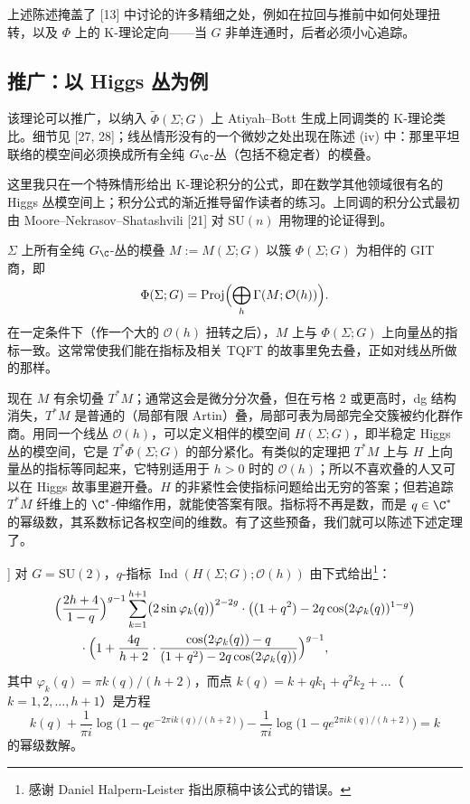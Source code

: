 上述陈述掩盖了 [13] 中讨论的许多精细之处，例如在拉回与推前中如何处理扭转，以及 $\Phi$ 上的 K-理论定向——当 $G$ 非单连通时，后者必须小心追踪。

\subsection{推广：以 Higgs 丛为例}

该理论可以推广，以纳入 $\tilde\Phi(\Sigma;G)$ 上 Atiyah--Bott 生成上同调类的 K-理论类比。细节见 [27, 28]；线丛情形没有的一个微妙之处出现在陈述 (iv) 中：那里平坦联络的模空间必须换成所有全纯 $G_\C$-丛（包括不稳定者）的模叠。

这里我只在一个特殊情形给出 K-理论积分的公式，即在数学其他领域很有名的 Higgs 丛模空间上；积分公式的渐近推导留作读者的练习。上同调的积分公式最初由 Moore--Nekrasov--Shatashvili [21] 对 $\mathrm{SU}(n)$ 用物理的论证得到。

$\Sigma$ 上所有全纯 $G_\C$-丛的模叠 $M:=M(\Sigma;G)$ 以簇 $\Phi(\Sigma;G)$ 为相伴的 GIT 商，即
\[
\Phi(\Sigma;G)=\operatorname{Proj}\Bigl(\bigoplus_h\Gamma(M;\mathcal{O}(h))\Bigr).
\]
在一定条件下（作一个大的 $\mathcal{O}(h)$ 扭转之后），$M$ 上与 $\Phi(\Sigma;G)$ 上向量丛的指标一致。这常常使我们能在指标及相关 TQFT 的故事里免去叠，正如对线丛所做的那样。

现在 $M$ 有余切叠 $T^*M$；通常这会是微分分次叠，但在亏格 $2$ 或更高时，dg 结构消失，$T^*M$ 是普通的（局部有限 Artin）叠，局部可表为局部完全交簇被约化群作商。用同一个线丛 $\mathcal{O}(h)$，可以定义相伴的模空间 $H(\Sigma;G)$，即半稳定 Higgs 丛的模空间，它是 $T^*\Phi(\Sigma;G)$ 的部分紧化。有类似的定理把 $T^*M$ 上与 $H$ 上向量丛的指标等同起来，它特别适用于 $h>0$ 时的 $\mathcal{O}(h)$；所以不喜欢叠的人又可以在 Higgs 故事里避开叠。$H$ 的非紧性会使指标问题给出无穷的答案；但若追踪 $T^*M$ 纤维上的 $\C^*$-伸缩作用，就能使答案有限。指标将不再是数，而是 $q\in\C^*$ 的幂级数，其系数标记各权空间的维数。有了这些预备，我们就可以陈述下述定理了。

\begin{theorem}[仿照 [28]]
对 $G=\mathrm{SU}(2)$，$q$-指标 $\operatorname{Ind}(H(\Sigma;G);\mathcal{O}(h))$ 由下式给出\footnote{感谢 Daniel Halpern-Leister 指出原稿中该公式的错误。}：
\[
\begin{aligned}
&\Bigl(\frac{2h+4}{1-q}\Bigr)^{g-1}\sum_{k=1}^{h+1}\bigl(2\sin\varphi_k(q)\bigr)^{2-2g}\cdot
\bigl((1+q^2)-2q\cos(2\varphi_k(q))^{1-g}\bigr)\\
&\qquad\cdot\Bigl(1+\frac{4q}{h+2}\cdot\frac{\cos(2\varphi_k(q))-q}{(1+q^2)-2q\cos(2\varphi_k(q))}\Bigr)^{g-1},
\end{aligned}
\]
其中 $\varphi_k(q)=\pi k(q)/(h+2)$，而点 $k(q)=k+qk_1+q^2k_2+\dots$（$k=1,2,\dots,h+1$）是方程
\[
k(q)+\frac{1}{\pi i}\log\bigl(1-qe^{-2\pi i k(q)/(h+2)}\bigr)
-\frac{1}{\pi i}\log\bigl(1-qe^{2\pi i k(q)/(h+2)}\bigr)=k
\]
的幂级数解。
\end{theorem}

